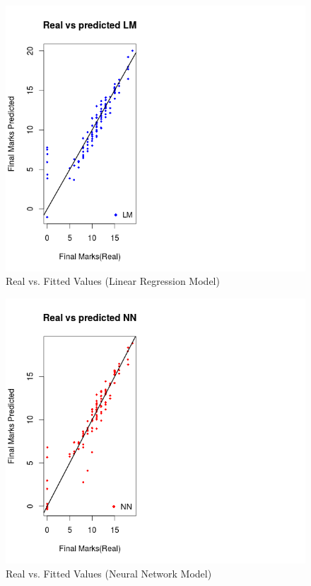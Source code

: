 \documentclass[conference]{IEEEtran}
\begin{document}
\begin{figure}
	\includegraphics[width=\linewidth]{math_lm.png}
	\caption{Real vs. Fitted Values (Linear Regression Model)}
	\label{fig:math-lm}
\end{figure}
\begin{figure}
	\includegraphics[width=\linewidth]{math_nn.png}
	\caption{Real vs. Fitted Values (Neural Network Model)}
	\label{fig:math-nn}
\end{figure}
\end{document}

